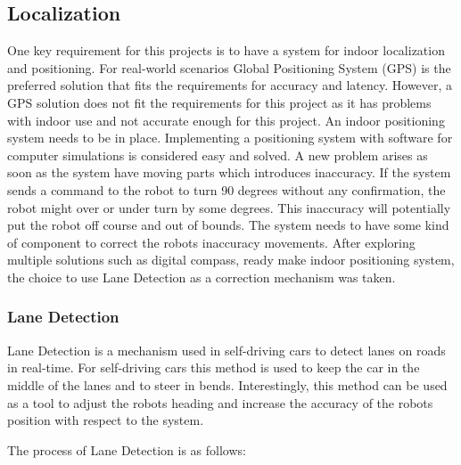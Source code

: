 \subsection{Localization}
One key requirement for this projects is to have a system for indoor localization and positioning. For real-world scenarios Global Positioning System (GPS) is the preferred solution that fits the requirements for accuracy and latency. However, a GPS solution does not fit the requirements for this project as it has problems with indoor use and not accurate enough for this project. An indoor positioning system needs to be in place. Implementing a positioning system with software for computer simulations is considered easy and solved. A new problem arises as soon as the system have moving parts which introduces inaccuracy. If the system sends a command to the robot to turn 90 degrees without any confirmation, the robot might over or under turn by some degrees. This inaccuracy will potentially put the robot off course and out of bounds. The system needs to have some kind of component to correct the robots inaccuracy movements. After exploring multiple solutions such as digital compass, ready make indoor positioning system, the choice to use Lane Detection as a correction mechanism was taken. 

\subsubsection{Lane Detection}
Lane Detection is a mechanism used in self-driving cars to detect lanes on roads in real-time. For self-driving cars this method is used to keep the car in the middle of the lanes and to steer in bends. Interestingly, this method can be used as a tool to adjust the robots heading and increase the accuracy of the robots position with respect to the system. \cite{aziz_implementation_2017}

\noindent The process of Lane Detection is as follows:

